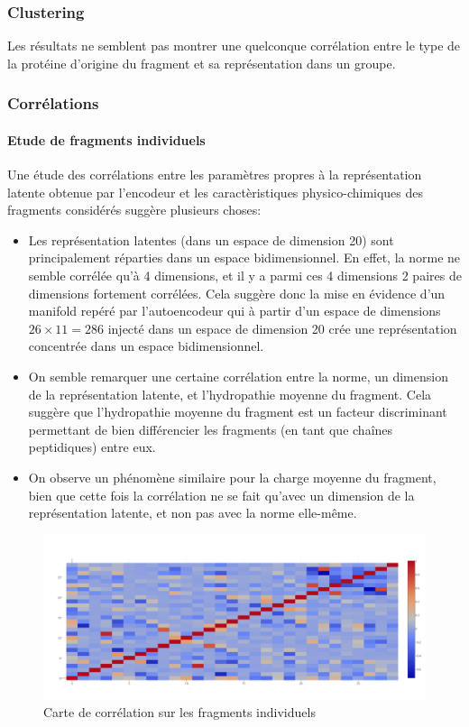 \documentclass[a4paper, journal, 11pt, onecolumn]{IEEEtran}
\begin{document}
\subsubsection{Clustering}

Les résultats ne semblent pas montrer une quelconque corrélation entre le type
de la protéine d'origine du fragment et sa représentation dans un groupe.

\subsubsection{Corrélations}

\paragraph{Etude de fragments individuels}

Une étude des corrélations entre les paramètres propres à la représentation
latente obtenue par l'encodeur et les caractèristiques physico-chimiques des
fragments considérés suggère plusieurs choses:
\begin{itemize}
\item Les représentation latentes (dans un espace de dimension 20) sont
  principalement réparties dans un espace bidimensionnel. En effet, la norme ne
  semble corrélée qu'à 4 dimensions, et il y a parmi ces 4 dimensions 2 paires
  de dimensions fortement corrélées. Cela suggère donc la mise en évidence d'un
  manifold repéré par l'autoencodeur qui à partir d'un espace de dimensions
  $26\times 11= 286$ injecté dans un espace de dimension 20 crée une
  représentation concentrée dans un espace bidimensionnel.
  
\item On semble remarquer une certaine corrélation entre la norme, un dimension
  de la représentation latente, et l'hydropathie moyenne du fragment. Cela
  suggère que l'hydropathie moyenne du fragment est un facteur discriminant
  permettant de bien différencier les fragments (en tant que chaînes
  peptidiques) entre eux.
\item On observe un phénomène similaire pour la charge moyenne du fragment, bien
  que cette fois la corrélation ne se fait qu'avec un dimension de la
  représentation latente, et non pas avec la norme elle-même.
\end{itemize}

\begin{figure}
  \centering
  \includegraphics[scale=0.3]{SingleOneRecHeat}
  \caption{Carte de corrélation sur les fragments individuels}
\end{figure}
\end{document}
